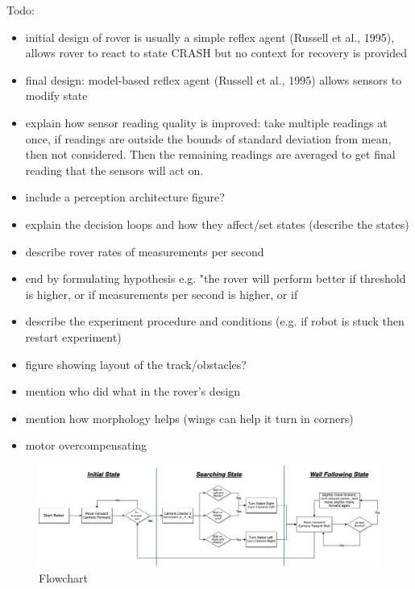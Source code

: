 \documentclass[a4paper,12pt,twocolumn]{article}
\begin{document}
Todo:
\begin{itemize}
    \item initial design of rover is usually a simple reflex agent (Russell et al., 1995), allows rover to react to state CRASH but no context for recovery is provided
    \item final design: model-based reflex agent (Russell et al., 1995) allows sensors to modify state
    \item explain how sensor reading quality is improved: take multiple readings at once, if readings are outside the bounds of standard deviation from mean, then not considered. Then the remaining readings are averaged to get final reading that the sensors will act on.
    \item include a perception architecture figure?
    \item explain the decision loops and how they affect/set states (describe the states)
    \item describe rover rates of measurements per second
    \item end by formulating hypothesis e.g. "the rover will perform better if threshold is higher, or if measurements per second is higher, or if 
    \item describe the experiment procedure and conditions (e.g. if robot is stuck then restart experiment)
    \item figure showing layout of the track/obstacles?
    \item mention who did what in the rover's design
    \item mention how morphology helps (wings can help it turn in corners)
    \item motor overcompensating
\end{itemize}

\begin{figure}[ht]
\centering
\includegraphics[width=\linewidth]{figures/System-Flowchart.png}
\caption{Flowchart}
  \label{fig:flowchart}
\end{figure}

\end{document}
